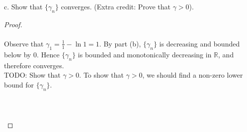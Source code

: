     \pagebreak

c.  Show that $\{\gamma_n\}$ converges. (Extra credit: Prove that $\gamma > 0$).

    \begin{proof}\renewcommand{\qedsymbol}{}\ \\\\
        Observe that $\gamma_1 = \frac{1}{1} - \ln{1} = 1$. By part (b),
        $\{\gamma_n\}$ is decreasing and bounded below by 0. Hence 
        $\{\gamma_n\}$ is bounded and monotonically decreasing in $\mathbb{R}$,
        and therefore converges.
        \\

        TODO: Show that $\gamma > 0$. To show that $\gamma > 0$, we should find a
        non-zero lower bound for $\{\gamma_n\}$.

        \begin{align*}
        \end{align*}
        \\\\
    \end{proof}